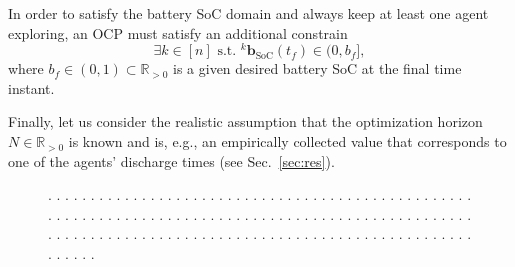 \documentclass[lettersize,journal,twoside]{IEEEtran}
\theoremstyle{definition}
\begin{document}
In order to satisfy the battery SoC domain and always keep at least one agent exploring, an OCP must satisfy an additional constrain
\begin{equation}\label{eq:ocpbattconst}
  \exists k\in[n]\text{ s.t. }{}^k\mathbf{b}_{\text{SoC}}(t_f)\in(0,b_f],
\end{equation}
where $b_f\in(0,1)\subset\mathbb{R}_{>0}$ is a given desired battery SoC at the final time instant.

Finally, let us consider the realistic assumption that the optimization horizon $N\in\mathbb{R}_{>0}$ is known and is,
e.g., an empirically collected value that corresponds to one of the agents' discharge times (see Sec.~\ref{sec:res}).

\begin{figure}[t]
  \vspace*{-.2cm}
  \begin{minipage}[c]{.42\columnwidth}
    \vspace*{.9cm}
    \caption{.   .   .   .   .   .   .   .   .   .   .   .   .   .   .   .   .   .   .   .   .   .   .   .   .   .   .   .   .   .   .   .   .   .   .   .   .   .   .   .   .   .   .   .   .   .   .   .   .   .   .   .   .   .   .   .   .   .   .   .   .   .   .   .   .   .   .   .   .   .   .   .   .   .   .   .   .   .   .   .   .   .   .   .   .   .   .   .   .   .   .   .   .   .   .   .   .   .   .   .   .   .   .   .   .   .   .   .   .   .   .   .   .   .   .   .   .   .   .   .   .   .   .   .   .   .   .   .   .   .   .   .   .   .   .   .   .   .   .   .   .   .   .   .   .   .   .   .   .   .   .   .   .   .   .   .} 
    \label{fig:thevenin}
  \end{minipage}
  \begin{minipage}[c]{.57\columnwidth}
    \centering
    
  \end{minipage}
  \vspace*{-.2cm}
\end{figure}
\end{document}
